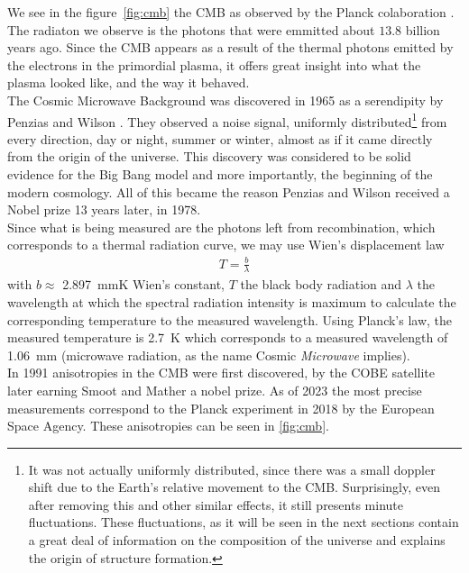 We see in the figure~\ref{fig:cmb} the CMB as observed by the Planck colaboration \cite{Planck2018}. The radiaton we observe is the photons that were emmitted about $13.8$ billion years ago. Since the CMB appears as a result of the thermal photons emitted by the electrons in the primordial plasma, it offers great insight into what the plasma looked like, and the way it behaved.  \\

The Cosmic Microwave Background was discovered in 1965 as a serendipity by Penzias and Wilson \cite{Penzias1965}. They observed a noise signal, uniformly distributed\footnote{It was not actually uniformly distributed, since there was a small doppler shift due to the Earth's relative movement to the CMB. Surprisingly, even after removing this and other similar effects, it still presents minute fluctuations. These fluctuations, as it will be seen in the next sections contain a great deal of information on the composition of the universe and explains the origin of structure formation.} from every direction, day or night, summer or winter, almost as if it came directly from the origin of the universe.
This discovery was considered to be solid evidence for the Big Bang model and more importantly, the beginning of the modern cosmology. All of this became the reason Penzias and Wilson received a Nobel prize 13 years later, in 1978. \\

Since what is being measured are the photons left from recombination, which corresponds to a thermal radiation curve, we may use Wien's displacement law  \\
\begin{align}
	T = \frac{b}{\lambda}
	\label{eq:wien-displacement}
\end{align}
with $b\approx $ \SI{2.897}{mmK} Wien's constant, $T$ the black body radiation and $\lambda$ the wavelength at which the spectral radiation intensity is maximum to calculate the corresponding temperature to the measured wavelength. Using Planck's law, the measured temperature is \SI{2.7}{K} which corresponds to a measured wavelength of \SI{1.06}{mm} (microwave radiation, as the name Cosmic \textit{Microwave} implies). \\

In 1991 anisotropies in the CMB were first discovered, by the COBE satellite\cite{SmootMather} later earning Smoot and Mather a nobel prize. As of 2023 the most precise measurements correspond to the Planck experiment in 2018 \cite{Planck2018} by the European Space Agency. These anisotropies can be seen in \ref{fig:cmb}. \\

